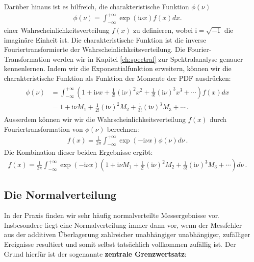 Darüber hinaus ist es hilfreich, die charakteristische Funktion $\phi(\nu)$
\begin{align}
\phi(\nu) = \int_{-\infty}^{+\infty} \exp ( \mathrm{i} \nu x) f ( x ) dx.
\label{eq:charakteristischefunktion}
\end{align}
 einer Wahrscheinlichkeitsverteilung $f(x)$ zu definieren, wobei $\mathrm{i}=\sqrt{-1}$ die imaginäre Einheit ist. Die charakteristische Funktion ist die inverse Fouriertransformierte der Wahrscheinlichkeitsverteilung. Die Fourier-Transformation werden wir in Kapitel \ref{ch:spectral} zur Spektralanalyse genauer kennenlernen.  Indem wir die Exponentialfunktion erweitern, können wir die charakteristische Funktion als Funktion der Momente der PDF ausdrücken:
\begin{align}
\begin{split}
\phi ( \nu ) & = \int_{-\infty}^{+\infty} \left( 1 + \mathrm{i} \nu x + \frac{ 1 }{ 2! } ( \mathrm{i} \nu )^2 x^2 + \frac{ 1 }{ 3! } ( \mathrm{i} \nu )^3 x^3 + \cdots \right) f ( x ) dx\\
& = 1 + \mathrm{i} \nu M_1 + \frac{ 1 }{ 2 ! } ( \mathrm{i} \nu )^2 M_2 + \frac{ 1 }{ 3! } ( \mathrm{i} \nu )^3 M_3 + \cdots\,.
\end{split}
\end{align}
Ausserdem können wir wir die Wahrscheinlichkeitsverteilung $f(x)$ durch Fouriertransformation von $\phi(\nu)$ berechnen:
\begin{align}
f ( x ) = \frac{ 1 }{ 2 \pi } \int_{-\infty}^{+\infty} \exp ( -\mathrm{i} \nu x ) \phi ( \nu ) d \nu\,.
\end{align}
Die Kombination dieser beiden Ergebnisse ergibt:
\begin{align}
f ( x ) = \frac{ 1 }{ 2 \pi } \int_{-\infty}^{+\infty} \exp ( -\mathrm{i} \nu x ) \left( 1 + \mathrm{i} \nu M_1 + \frac{ 1 }{ 2 ! } ( \mathrm{i} \nu )^2 M_2 + \frac{ 1 }{ 3! } ( \mathrm{i} \nu )^3 M_3 + \cdots \right)  d \nu\,.
\end{align}

\subsection{Die Normalverteilung}

In der Praxis finden wir sehr häufig normalverteilte Messergebnisse vor. Insbesondere liegt eine Normalverteilung immer dann vor, wenn der Messfehler  aus der additiven Überlagerung zahlreicher unabhängiger unabhängiger, zufälliger Ereignisse resultiert und somit selbst tatsächlich vollkommen zufällig ist.  Der Grund hierfür ist der sogenannte \textbf{zentrale Grenzwertsatz}:\\

